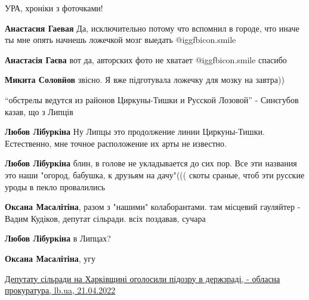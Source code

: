  
 
 
 
 
\zzSecCmt


\begin{itemize} %
УРА, хроніки з фоточками!

\textbf{Анастасия Гаевая} Да, исключительно потому что вспомнил в городе, что иначе ты мне опять начнешь ложечкой мозг выедать  @igg{fbicon.smile} 

\textbf{Анастасія Гаєва} вот да, авторских фото не хватает  @igg{fbicon.smile} 
спасибо

\textbf{Микита Соловйов} звісно. Я вже підготувала ложечку для мозку на завтра))

\enquote{обстрелы ведутся из районов Циркуны-Тишки и Русской Лозовой} - Синєгубов казав, що з Липців

\begin{itemize} %
\textbf{Любов Лібуркіна} Ну Липцы это продолжение линии Циркуны-Тишки. Естественно, мне точное расположение их арты не известно.

\textbf{Любов Лібуркіна} блин, в голове не укладывается до сих пор. Все эти названия это наши "огород, бабушка, к друзьям на дачу"((( скоты сраные, чтоб эти русские уроды в пекло провалились

\textbf{Оксана Масалітіна}, разом з "нашими" колаборантами. там місцевий гауляйтер - Вадим Кудіков, депутат сільради. всіх поздавав, сучара

\textbf{Любов Лібуркіна} в Липцах?

\textbf{Оксана Масалітіна}, угу

\href{https://lb.ua/society/2022/04/21/514272_deputatu_silradi_harkivshchini.html}{%
Депутату сільради на Харківщині оголосили підозру в держзраді, - обласна прокуратура, lb.ua, 21.04.2022%
}

\end{itemize} %



\end{itemize}
